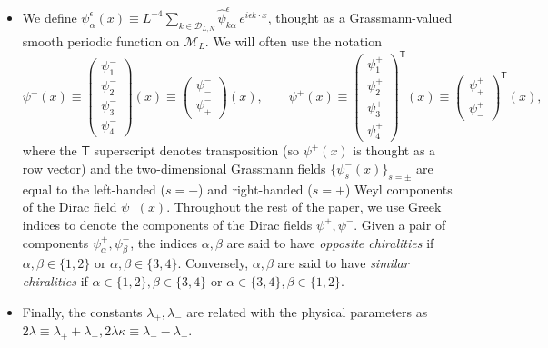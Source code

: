 \documentclass[a4paper, 11pt]{article}
\theoremstyle{thm}
\begin{document}
\begin{itemize}
\item We define $
\psi_\alpha^\epsilon(x) \equiv L^{-4} \sum_{k \in \mathcal{D}_{L, N}} \hat{\psi}_{k \alpha}^\epsilon \, e^{i \epsilon k \cdot x}$, thought as a Grassmann-valued smooth periodic function on $\mathcal{M}_L$. We will often use the notation
\begin{equation}
\psi^-(x) \equiv 
\begin{pmatrix}
\psi^-_1 \\ \psi^-_2 \\ \psi^-_3 \\ \psi^-_4
\end{pmatrix}(x)
\equiv 
\begin{pmatrix}
\psi^-_- \\[2pt] \psi^-_+
\end{pmatrix}(x),
\qquad
\psi^+(x) \equiv
\begin{pmatrix}
\psi_1^+ \\ \psi^+_2 \\ \psi^+_3 \\ \psi^+_4
\end{pmatrix}^{\!\!\mathsf{T}}(x)
\equiv 
\begin{pmatrix}
\psi^+_+		\\	\psi^+_-
\end{pmatrix}^{\!\!\mathsf{T}}(x),
\end{equation}
where the $\mathsf{T}$ superscript denotes transposition (so $\psi^+(x)$ is thought as a row vector) and the two-dimensional Grassmann fields $\lbrace \psi^-_s(x) \rbrace_{s = \pm}$ are equal to the left-handed ($s = -$) and right-handed ($s = +$) Weyl components of the Dirac field $\psi^-(x)$. Throughout the rest of the paper, we use Greek indices to denote the components of the Dirac fields $\psi^+, \psi^-$. Given a pair of components $\psi^+_\alpha, \psi^-_\beta$, the indices $\alpha, \beta$ are said to have \emph{opposite chiralities} if $\alpha, \beta \in \lbrace 1, 2 \rbrace$ or $\alpha, \beta \in \lbrace 3, 4 \rbrace$. Conversely, $\alpha, \beta$ are said to have \emph{similar chiralities} if $\alpha \in \lbrace 1, 2 \rbrace, \beta \in \lbrace 3, 4 \rbrace$ or $\alpha \in \lbrace 3, 4 \rbrace, \beta \in \lbrace 1, 2 \rbrace$.
\item Finally, the constants $\lambda_+, \lambda_-$ are related with the physical parameters as $2\lambda \equiv \lambda_+ + \lambda_-, 2\lambda \kappa \equiv \lambda_- - \lambda_+$.
\end{itemize}
\end{document}
